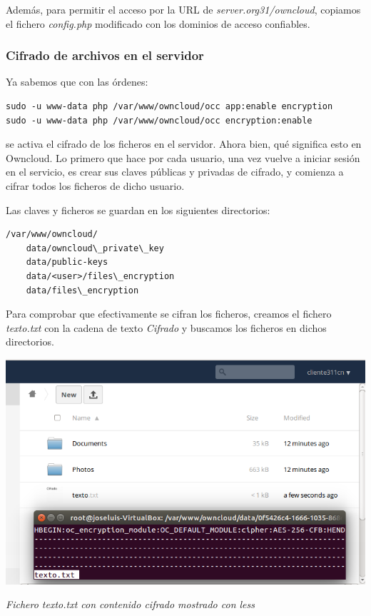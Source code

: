 \documentclass[]{article}
\begin{document}
Además, para permitir el acceso por la URL de \textit{server.org31/owncloud}, copiamos el fichero \textit{config.php} modificado con los dominios de acceso confiables.

\subsubsection{Cifrado de archivos en el servidor}

Ya sabemos que con las órdenes:
\begin{Verbatim}
sudo -u www-data php /var/www/owncloud/occ app:enable encryption
sudo -u www-data php /var/www/owncloud/occ encryption:enable
\end{Verbatim}

se activa el cifrado de los ficheros en el servidor. Ahora bien, qué significa esto en Owncloud. Lo primero que hace por cada usuario, una vez vuelve a iniciar sesión en el servicio, es crear sus claves públicas y privadas de cifrado, y comienza a cifrar todos los ficheros de dicho usuario.

Las claves y ficheros se guardan en los siguientes directorios:

\begin{Verbatim}
/var/www/owncloud/	
	data/owncloud\_private\_key
	data/public-keys
	data/<user>/files\_encryption
	data/files\_encryption 
\end{Verbatim}

Para comprobar que efectivamente se cifran los ficheros, creamos el fichero \textit{texto.txt} con la cadena de texto \textit{Cifrado} y buscamos los ficheros en dichos directorios.

\begin{center}
	\includegraphics[scale=0.65]{images/owncloud/1.png}
	
	\textit{Fichero texto.txt con contenido cifrado mostrado con less}
\end{center}
\end{document}
